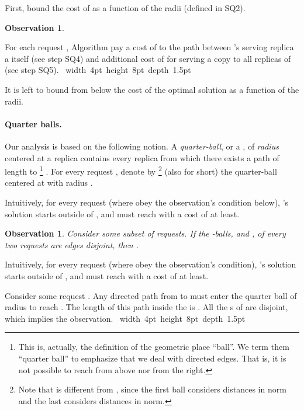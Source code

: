 \documentclass[11pt]{article}
\newtheorem{observation}[theorem]{Observation}
\def\proof{\par\noindent{\bf Proof:~}}
\def\blackslug{\hbox{\hskip 1pt \vrule width 4pt height 8pt
    depth 1.5pt \hskip 1pt}}
\def\QED{\quad\blackslug\lower 8.5pt\null\par}
\begin{document}
\vspace{-0.2cm}

First, bound the cost of   as a function of the radii (defined in SQ2).


\begin{observation}

\label{obser:sqr: cost Square > 14 sum radii}
\end{observation}
\proof
For each request , Algorithm  pay a cost of  to the path between 's serving replica  a  itself (see step SQ4) and additional cost of  for serving a copy to all replicas of  (see step SQ5).
\QED


It is left to bound from below the cost of the optimal solution as a function of the radii.


\paragraph*{\bf Quarter balls.}
Our analysis is based on the following notion.
A \emph{quarter-ball}, or a , of \emph{radius}
 centered at a replica  contains every replica
from which there exists a path of length  to 
\footnote{
This is, actually, the definition of the geometric place ``ball''.
We term them ``quarter ball'' to emphasize that we deal with directed edges.
That is, it is not possible to reach  from above nor from the right.
}
.
For every request , denote by 
\footnote{
Note that  is different from , since the first ball considers distances in  norm and the last considers distances in  norm.
}
(also  for short) the quarter-ball centered at  with radius .

Intuitively, for every request  (where  obey the observation's condition below), 's solution starts outside of ,
and must reach  with a cost of  at least.

\begin{observation}
Consider some subset  of requests.
If the -balls,  and
, of every two requests   are edges disjoint, then
.
\label{obser:sqr:opt geq sum rho_i}
\end{observation}
Intuitively, for every request  (where  obey the observation's condition), 's solution starts outside of ,
and must reach  with a cost of  at least.
\proof
Consider some request .
Any directed path from  to  must enter the quarter ball  of radius  to reach .
The length of this path inside the  is .
All the s of  are disjoint, which implies the observation.
\QED
\end{document}

